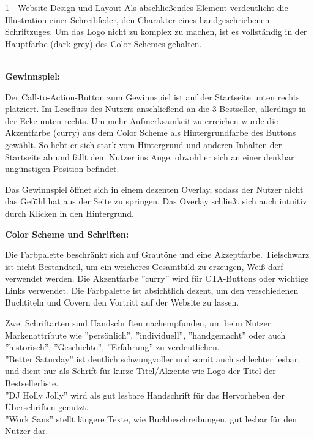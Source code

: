 \documentclass[a4paper]{article}
\begin{document}
\begin{exercise}{1 - Website Design und Layout}
Als abschließendes Element verdeutlicht die Illustration einer Schreibfeder, den Charakter eines handgeschriebenen Schriftzuges.
Um das Logo nicht zu komplex zu machen, ist es vollständig in der Hauptfarbe (dark grey) des Color Schemes gehalten.\\\\

\begin{Large}
\textbf{Gewinnspiel:}
\end{Large}
Der Call-to-Action-Button zum Gewinnspiel ist auf der Startseite unten rechts platziert. Im Lesefluss des Nutzers anschließend an die 3 Bestseller, allerdings in der Ecke unten rechts. Um mehr Aufmerksamkeit zu erreichen wurde die Akzentfarbe (curry) aus dem Color Scheme als Hintergrundfarbe des Buttons gewählt.
So hebt er sich stark vom Hintergrund und anderen Inhalten der Startseite ab und fällt dem Nutzer ins Auge, obwohl er sich an einer denkbar ungünstigen Position befindet.

Das Gewinnspiel öffnet sich in einem dezenten Overlay, sodass der Nutzer nicht das Gefühl hat aus der Seite zu springen. Das Overlay schließt sich auch intuitiv durch Klicken in den Hintergrund.
\newpage
\begin{Large}
\textbf{Color Scheme und Schriften:}
\end{Large}
Die Farbpalette beschränkt sich auf Grautöne und eine Akzeptfarbe. Tiefschwarz ist nicht Bestandteil, um ein weicheres Gesamtbild zu erzeugen, Weiß darf verwendet werden. Die Akzentfarbe ''curry'' wird für CTA-Buttons oder wichtige Links verwendet. 
Die Farbpalette ist absichtlich dezent, um den verschiedenen Buchtiteln und Covern den Vortritt auf der Website zu lassen. 

Zwei Schriftarten sind Handschriften nachempfunden, um beim Nutzer Markenattribute wie ''persönlich'', ''individuell'', ''handgemacht'' oder auch ''historisch'', ''Geschichte'', ''Erfahrung''  zu verdeutlichen. \\
''Better Saturday'' ist deutlich schwungvoller und somit auch schlechter lesbar, und dient nur als Schrift für kurze Titel/Akzente wie Logo der Titel der Bestsellerliste. \\
''DJ Holly Jolly'' wird als gut lesbare Handschrift für das Hervorheben der Überschriften genutzt. \\
''Work Sans'' stellt längere Texte, wie Buchbeschreibungen, gut lesbar für den Nutzer dar.


\end{exercise}
\end{document}
